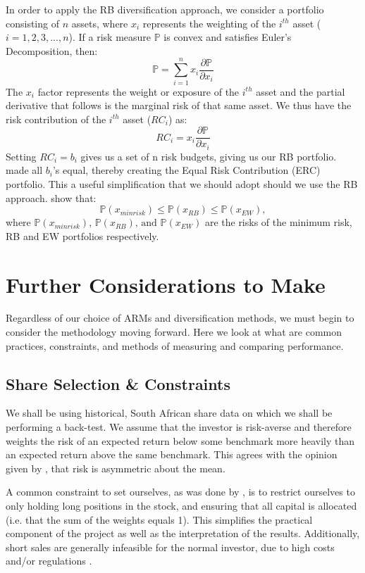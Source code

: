 \documentclass[12pt,a4paper]{article}
\begin{document}
In order to apply the RB diversification approach, we consider a portfolio consisting of $n$ assets, where $x_i$ represents the weighting of the $i^{th}$ asset ($i=1,2,3,...,n$). If a risk measure $\mathbb{P}$ is convex and satisfies Euler's Decomposition, then:
$$
\mathbb{P}=\sum_{i=1}^{n}x_{i}\frac{\partial\mathbb{P}}{\partial{x_{i}}}
$$
The $x_i$ factor represents the weight or exposure of the $i^{th}$ asset and the partial derivative that follows is the marginal risk of that same asset. We thus have the risk contribution of the $i^{th}$ asset ($RC_i$) as:
$$
RC_i=x_{i}\frac{\partial\mathbb{P}}{\partial{x_{i}}}
$$
Setting $RC_i=b_i$ gives us a set of n risk budgets, giving us our RB portfolio. \cite{bruder2012managing} made all $b_i$'s equal, thereby creating the Equal Risk Contribution (ERC) portfolio. This a useful simplification that we should adopt should we use the RB approach. \cite{bruder2012managing} show that:
$$
\mathbb{P}(x_{min risk}) \leq \mathbb{P}(x_{RB}) \leq \mathbb{P}(x_{EW}),
$$
where
$\mathbb{P}(x_{min risk}) \text{, } \mathbb{P}(x_{RB}) \text{, and } \mathbb{P}(x_{EW})
$
are the risks of the minimum risk, RB and EW portfolios respectively. 

\section{Further Considerations to Make}
\label{sec:Further}

Regardless of our choice of ARMs and diversification methods, we must begin to consider the methodology moving forward. Here we look at what are common practices, constraints, and methods of measuring and comparing performance. 

\subsection{Share Selection \& Constraints}
\label{subsec:Constraints}

We shall be using historical, South African share data on which we shall be performing a back-test. We assume that the investor is risk-averse and therefore weights the risk of an expected return below some benchmark more heavily than an expected return above the same benchmark. This agrees with the opinion given by \cite{CHEN20111777}, that risk is asymmetric about the mean. 

A common constraint to set ourselves, as was done by \cite{righi2017simulation}, is to restrict ourselves to only holding long positions in the stock, and ensuring that all capital is allocated (i.e. that the sum of the weights equals 1). This simplifies the practical component of the project as well as the interpretation of the results. Additionally, short sales are generally infeasible for the normal investor, due to high costs and/or regulations \citep{CHEN20111777}.
\end{document}

